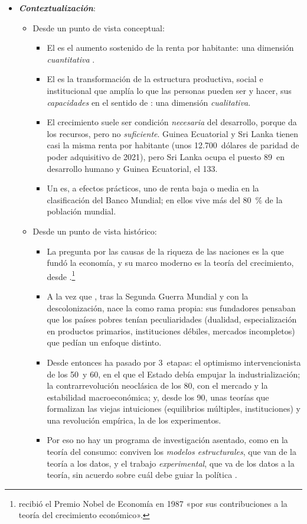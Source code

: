 \documentclass[11pt]{article}
\begin{document}
\begin{itemize}
\item \textbf{\emph{Contextualización}}:
  \begin{itemize}
  \item Desde un punto de vista conceptual:
  \begin{itemize}
  \item El  es el aumento sostenido de la renta por habitante: una dimensión \emph{cuantitativa} .
  \item El  es la transformación de la estructura productiva, social e institucional que amplía lo que las personas pueden ser y hacer, sus \emph{capacidades} en el sentido de \textcite{Sen1999}: una dimensión \emph{cualitativa}.
  \item El crecimiento suele ser condición \emph{necesaria} del desarrollo, porque da los recursos, pero no \emph{suficiente}. Guinea Ecuatorial y Sri Lanka tienen casi la misma renta por habitante (unos 12.700~dólares de paridad de poder adquisitivo de 2021), pero Sri Lanka ocupa el puesto 89~en desarrollo humano y Guinea Ecuatorial, el 133\nocite{PNUD2025IDH}.
  \item Un  es, a efectos prácticos, uno de renta baja o media en la clasificación del Banco Mundial; en ellos vive más del 80~\% de la población mundial\nocite{BM2026WDI}.
  \end{itemize}
  \item Desde un punto de vista histórico:
  \begin{itemize}
  \item La pregunta por las causas de la riqueza de las naciones es la que fundó la economía\nocite{Smith1776Wealth}, y su marco moderno es la teoría del crecimiento, desde \textcite{Solow1956}.\footnote{ recibió el Premio Nobel de Economía en 1987 «por sus contribuciones a la teoría del crecimiento económico»\nocite{Nobel1987Solow}.}
  \item A la vez que , tras la Segunda Guerra Mundial y con la descolonización, nace la  como rama propia: sus fundadores pensaban que los países pobres tenían peculiaridades (dualidad, especialización en productos primarios, instituciones débiles, mercados incompletos) que pedían un enfoque distinto.
  \item Desde entonces ha pasado por 3~etapas: el optimismo intervencionista de los 50~y 60, en el que el Estado debía empujar la industrialización; la contrarrevolución neoclásica de los 80, con el mercado y la estabilidad macroeconómica; y, desde los 90, unas teorías que formalizan las viejas intuiciones (equilibrios múltiples, instituciones) y una revolución empírica, la de los experimentos.
  \item Por eso no hay un programa de investigación asentado, como en la teoría del consumo: conviven los \emph{modelos estructurales}, que van de la teoría a los datos, y el trabajo \emph{experimental}, que va de los datos a la teoría, sin acuerdo sobre cuál debe guiar la política .
  \end{itemize}
  \end{itemize}


\end{itemize}
\end{document}
